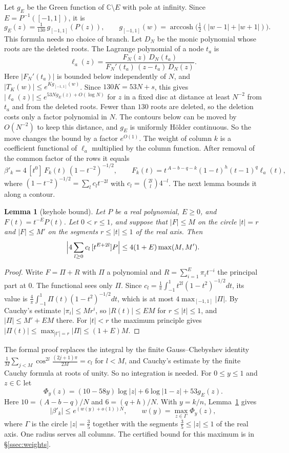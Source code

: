 \documentclass[11pt]{amsart}
\newtheorem{lemma}[theorem]{Lemma}
\theoremstyle{definition}
\theoremstyle{remark}
\numberwithin{equation}{section}
\newcommand{\C}{\mathbb C}
\begin{document}
Let $g_E$ be the Green function of $\C\setminus E$ with pole at infinity. Since $E=P^{-1}([-1,1])$, it is
\[
 g_E(z)=\tfrac1{130}\,g_{[-1,1]}(P(z)),\qquad
 g_{[-1,1]}(w)=\operatorname{arccosh}\bigl(\tfrac12(|w-1|+|w+1|)\bigr).
\]
This formula needs no choice of branch. Let $D_N$ be the monic polynomial whose roots are the deleted roots.
The Lagrange polynomial of a node $t_a$ is
\[
 \ell_a(z)=\frac{F_N(z)\,D_N(t_a)}{F_N'(t_a)\,(z-t_a)\,D_N(z)}.
\]
Here $|F_N'(t_a)|$ is bounded below independently of $N$, and $|T_K(w)|\le e^{Kg_{[-1,1]}(w)}$. Since $130K=53N+s$, this gives $|\ell_a(z)|\le e^{53Ng_E(z)+O(\log N)}$ for $z$ in
a fixed disc at distance at least $N^{-2}$ from $t_a$ and from the deleted roots. Fewer than $130$ roots
are deleted, so the deletion costs only a factor polynomial in $N$. The contours below can be moved by
$O(N^{-2})$ to keep this distance, and $g_E$ is uniformly H\"older continuous. So the move changes the
bound by a factor $e^{O(1)}$. The weight of column $k$ is a
coefficient functional of $\ell_a$ multiplied by the column function. After removal of the common factor of
the rows it equals
\[
 \beta'_k=4\,[t^0]\,F_k(t)\,(1-t^{-2})^{-1/2},\qquad F_k(t)=t^{\,A-b-q-k}(1-t)^h(t-1)^q\ell_a(t),
\]
where $(1-t^{-2})^{-1/2}=\sum_lc_lt^{-2l}$ with $c_l=\binom{2l}l4^{-l}$. The next lemma bounds it along a contour.

\begin{lemma}[keyhole bound]\label{lem:keyhole}
Let $P$ be a real polynomial, $E\ge0$, and $F(t)=t^{-E}P(t)$. Let $0<r\le1$, and suppose that $|F|\le M$ on
the circle $|t|=r$ and $|F|\le M'$ on the segments $r\le|t|\le1$ of the real axis. Then
\[
 \Bigl|4\sum_{l\ge0}c_l\,[t^{E+2l}]P\Bigr|\le4(1+E)\max(M,M').
\]
\end{lemma}

\begin{proof}
Write $F=\Pi+R$ with $\Pi$ a polynomial and $R=\sum_{i=1}^E\pi_it^{-i}$ the principal part at $0$. The
functional sees only $\Pi$. Since $c_l=\frac1\pi\int_{-1}^1t^{2l}(1-t^2)^{-1/2}dt$, its value is
$\frac4\pi\int_{-1}^1\Pi(t)(1-t^2)^{-1/2}dt$, which is at most $4\max_{[-1,1]}|\Pi|$. By Cauchy's estimate
$|\pi_i|\le Mr^i$, so $|R(t)|\le EM$ for $r\le|t|\le1$, and $|\Pi|\le M'+EM$ there. For $|t|<r$ the maximum
principle gives $|\Pi(t)|\le\max_{|t'|=r}|\Pi|\le(1+E)M$.
\end{proof}

The formal proof replaces the integral by the finite Gauss--Chebyshev identity
$\frac1M\sum_{j<M}\cos^{2l}\frac{(2j+1)\pi}{2M}=c_l$ for $l<M$, and Cauchy's estimate by the finite Cauchy formula
at roots of unity. So no integration is needed. For $0\le y\le1$ and $z\in\C$ let
\[
 \Phi_y(z)=(10-58y)\log|z|+6\log|1-z|+53g_E(z).
\]
Here $10=(A-b-q)/N$ and $6=(q+h)/N$. With $y=k/n$, Lemma~\ref{lem:keyhole} gives
\begin{equation}\label{eq:wk}
 |\beta'_k|\le e^{(w(y)+o(1))N},\qquad w(y)=\max_{z\in\Gamma}\Phi_y(z),
\end{equation}
where $\Gamma$ is the circle $|z|=\frac35$ together with the segments $\frac35\le|z|\le1$ of the real axis. One
radius serves all columns. The certified bound for this maximum is in \S\ref{ssec:weights}.
\end{document}
